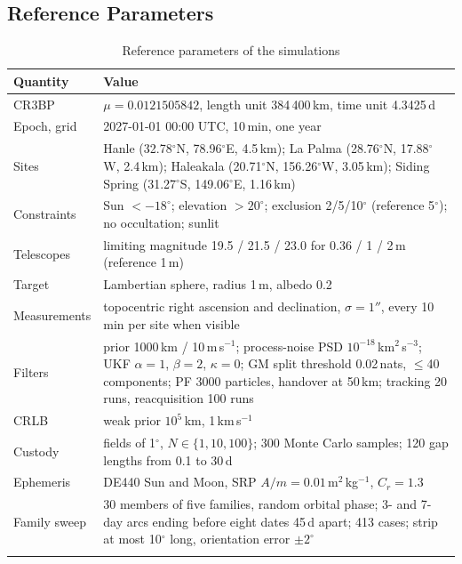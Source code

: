 \documentclass[pdflatex,sn-mathphys-num]{sn-jnl}
\begin{document}
\begin{appendices}
\section{Reference Parameters}\label{app:params}
\begin{table}[h]
\caption{Reference parameters of the simulations}\label{tab:params}
\begin{tabular*}{\textwidth}{@{\extracolsep\fill}lp{}}
\toprule
Quantity & Value\\
\midrule
CR3BP & $\mu = 0.0121505842$, length unit 384\,400\,km, time unit 4.3425\,d\\
Epoch, grid & 2027-01-01 00:00 UTC, 10\,min, one year\\
Sites & Hanle (32.78$^\circ$N, 78.96$^\circ$E, 4.5\,km); La Palma (28.76$^\circ$N, 17.88$^\circ$W, 2.4\,km); Haleakala (20.71$^\circ$N, 156.26$^\circ$W, 3.05\,km); Siding Spring (31.27$^\circ$S, 149.06$^\circ$E, 1.16\,km)\\
Constraints & Sun $< -18^\circ$; elevation $> 20^\circ$; exclusion 2/5/10$^\circ$ (reference 5$^\circ$); no occultation; sunlit\\
Telescopes & limiting magnitude 19.5 / 21.5 / 23.0 for 0.36 / 1 / 2\,m (reference 1\,m)\\
Target & Lambertian sphere, radius 1\,m, albedo 0.2\\
Measurements & topocentric right ascension and declination, $\sigma = 1''$, every 10\,min per site when visible\\
Filters & prior 1000\,km / 10\,m\,s$^{-1}$; process-noise PSD $10^{-18}$\,km$^2$\,s$^{-3}$; UKF $\alpha=1$, $\beta=2$, $\kappa=0$; GM split threshold 0.02\,nats, $\le$40 components; PF 3000 particles, handover at 50\,km; tracking 20 runs, reacquisition 100 runs\\
CRLB & weak prior $10^5$\,km, 1\,km\,s$^{-1}$\\
Custody & fields of 1$^\circ$, $N \in \{1,10,100\}$; 300 Monte Carlo samples; 120 gap lengths from 0.1 to 30\,d\\
Ephemeris & DE440 Sun and Moon, SRP $A/m = 0.01$\,m$^2$\,kg$^{-1}$, $C_r = 1.3$\\
Family sweep & 30 members of five families, random orbital phase; 3- and 7-day arcs ending before eight dates 45\,d apart; 413 cases; strip at most 10$^\circ$ long, orientation error $\pm2^\circ$\\
\botrule
\end{tabular*}
\end{table}
\end{appendices}


\end{document}
